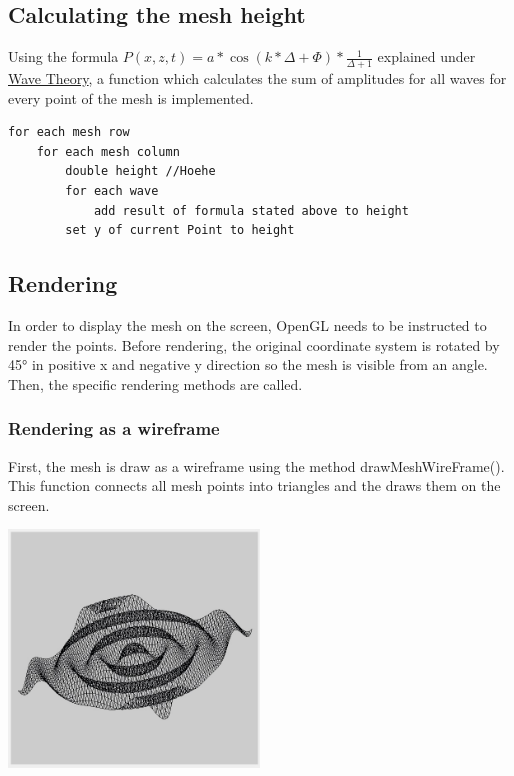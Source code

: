 \documentclass[12pt,a4paper]{scrartcl}
\begin{document}
\subsection{Calculating the mesh height}
Using the formula $P(x,z,t) = a * \cos(k * {\Delta} + \Phi) * \frac{1}{{\Delta}+1} $ explained under \hyperref[wave-theory]{Wave Theory}, a function  which calculates the sum of amplitudes for all waves for every point of the mesh is implemented.

\begin{lstlisting}[language=PSEUDO]
for each mesh row
	for each mesh column
		double height //Hoehe
		for each wave
			add result of formula stated above to height
		set y of current Point to height
\end{lstlisting}

\subsection{Rendering}
In order to display the mesh on the screen, OpenGL needs to be instructed to render the points. Before rendering, the original coordinate system is rotated by 45° in positive x and negative y direction so the mesh is visible from an angle. Then, the specific rendering methods are called.

\subsubsection{Rendering as a wireframe}
First, the mesh is draw as a wireframe using the method drawMeshWireFrame(). This function connects all mesh points into triangles and the draws them on the screen.

\begin{center}
	\includegraphics[width=0.5\textwidth]{Images/RenderingWireframe.jpg}
\end{center} 
\end{document}
